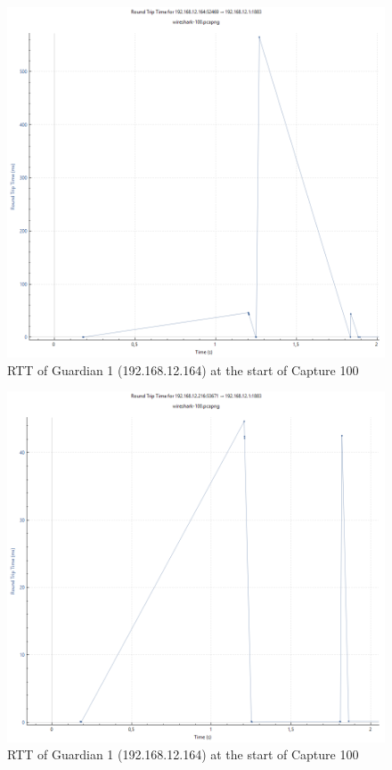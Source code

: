 \begin{figure}[h!]
    \centering
    \includegraphics[width=\textwidth]{abbildungen/wireshark/100-g1.png}
    \caption{\ac{RTT} of Guardian 1 (192.168.12.164) at the start of Capture 100}
    \label{fig:rtt-g1-100}
\end{figure}
\begin{figure}[h!]
    \centering
    \includegraphics[width=\textwidth]{abbildungen/wireshark/100-g2.png}
    \caption{\ac{RTT} of Guardian 1 (192.168.12.164) at the start of Capture 100}
    \label{fig:rtt-g2-100}
\end{figure}
        
